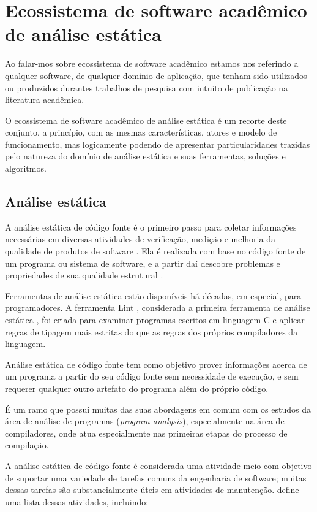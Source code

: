 \section{Ecossistema de software acadêmico de análise estática} \label{analise-estatica}

Ao falar-mos sobre ecossistema de software acadêmico estamos nos referindo a
qualquer software, de qualquer domínio de aplicação, que tenham sido utilizados
ou produzidos durantes trabalhos de pesquisa com intuito de publicação na
literatura acadêmica.

O ecossistema de software acadêmico de análise estática é um recorte deste
conjunto, a princípio, com as mesmas características, atores e modelo de
funcionamento, mas logicamente podendo de apresentar particularidades trazidas
pelo natureza do domínio de análise estática e suas ferramentas, soluções e
algoritmos.

\subsection{Análise estática}

A análise estática de código fonte é o primeiro passo para coletar informações
necessárias em diversas atividades de verificação, medição e melhoria da
qualidade de produtos de software \cite{Cruz2009, Kirkov2010}. Ela é
realizada com base no código fonte de um programa ou sistema de software, e a
partir daí descobre problemas e propriedades de sua qualidade estrutural
\cite{Chess2007}.

Ferramentas de análise estática estão disponíveis há décadas, em especial,
para programadores. A ferramenta Lint \cite{Johnson1978}, considerada a
primeira ferramenta de análise estática \cite{Gosain2015}, foi criada para
examinar programas escritos em linguagem C e aplicar regras de tipagem mais
estritas do que as regras dos próprios compiladores da linguagem.

Análise estática de código fonte tem como objetivo prover
informações acerca de um programa a partir do seu código fonte sem
necessidade de execução, e sem requerer qualquer outro artefato do programa
além do próprio código.

É um ramo que possui muitas das suas abordagens em comum com os estudos da
área de análise de programas ({\it program analysis}), especialmente na área de
compiladores, onde atua especialmente nas primeiras etapas do processo de compilação.

A análise estática de código fonte é considerada uma atividade meio com
objetivo de suportar uma variedade de tarefas comuns da engenharia de
software; muitas dessas tarefas são substancialmente úteis em atividades de
manutenção.  define uma lista dessas
atividades, incluindo:

